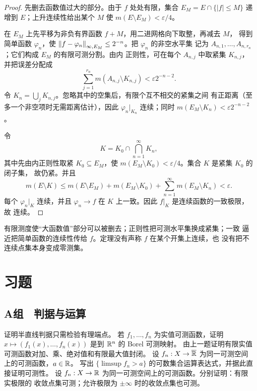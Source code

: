 \begin{proof}
先删去函数值过大的部分。由于 $f$ 处处有限，集合
$E_M=E\cap\{|f|\le M\}$ 递增到 $E$；上升连续性给出某个 $M$ 使
$m(E\setminus E_M)<\varepsilon/4$。

在 $E_M$ 上先平移为非负有界函数 $f+M$，用二进网格向下取整，再减去 $M$，
得到简单函数 $\varphi_n$，使
$\left\lVert f-\varphi_n\right\rVert_{\infty,E_M}\le2^{-n}$。把 $\varphi_n$ 的非空水平集
记为 $A_{n,1},\ldots,A_{n,r_n}$；它们构成 $E_M$ 的有限可测分割。由内
正则性，可在每个 $A_{n,j}$ 中取紧集 $K_{n,j}$，并把误差分配成
\[
 \sum_{j=1}^{r_n}m(A_{n,j}\setminus K_{n,j})
 <\varepsilon2^{-n-2}.
\]
令 $K_n=\bigcup_jK_{n,j}$。忽略其中的空集后，有限个互不相交的紧集之间
有正距离（至多一个非空项时无需距离估计），因此
$\varphi_n|_{K_n}$ 连续；同时
$m(E_M\setminus K_n)<\varepsilon2^{-n-2}$。

令
\[
 K=K_0\cap\bigcap_{n=1}^{\infty}K_n,
\]
其中先由内正则性取紧 $K_0\subseteq E_M$，使
$m(E_M\setminus K_0)<\varepsilon/4$。集合 $K$ 是紧集 $K_0$ 的闭子集，
故仍紧。并且
\[
 m(E\setminus K)
 \le m(E\setminus E_M)+m(E_M\setminus K_0)
    +\sum_{n=1}^{\infty}m(E_M\setminus K_n)
 <\varepsilon.
\]
每个 $\varphi_n|_K$ 连续，并且
$\varphi_n\to f$ 在 $K$ 上一致。因此 $f|_K$ 是连续函数的一致极限，故
连续。
\end{proof}

有限测度使“大函数值”部分可以被删去；正则性把可测水平集换成紧集；一致
逼近把简单函数的连续性传给 $f$。定理没有声称 $f$ 在某个开集上连续，也
没有把不连续点集本身变成零测集。

\section*{习题}

\subsection*{A组　判据与运算}
\begin{enumerate}[label=\textbf{\thechapter.\arabic*.}]
 证明半直线判据只需检验有理端点。
 若 $f_1,\ldots,f_n$ 为实值可测函数，证明
 $x\mapsto(f_1(x),\ldots,f_n(x))$ 是到 $\mathbb{R}^n$ 的 Borel 可测映射。
 由上一题证明有限实值可测函数对加、乘、绝对值和有限最大值封闭。
 设 $f_n:X\to\overline{\mathbb{R}}$ 为同一可测空间上的可测函数，$a\in\mathbb{R}$。
 写出 $\{\limsup f_n>a\}$ 的可数集合运算表达式，并据此直接证明可测性。
 设 $f_n:X\to\mathbb{R}$ 为同一可测空间上的可测函数。分别证明：有限实极限的
 收敛点集可测；允许极限为 $\pm\infty$ 时的收敛点集也可测。
\end{enumerate}

